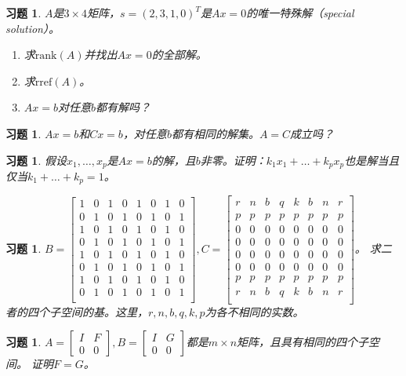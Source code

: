 \documentclass[UTF8]{ctexart}
\newcommand{\rref}{\mathrm{rref}}
\newcommand{\rank}{{\mathrm{rank}}}
\newtheorem{ex}[thm]{习题}
\begin{document}
\begin{ex}
		$A$是$3\times 4$矩阵，$s=(2,3,1,0)^T$是$Ax=0$的唯一特殊解（special solution）。
	\begin{enumerate}
		\item 求$\rank(A)$并找出$Ax=0$的全部解。
		\item 求$\rref(A)$。
			\item $Ax=b$对任意$b$都有解吗？
	\end{enumerate}
\end{ex}
\begin{ex}
		$Ax=b$和$Cx=b$，对任意$b$都有相同的解集。$A=C$成立吗？
\end{ex}



\begin{ex}
	假设$x_1,\dots,x_p$是$Ax=b$的解，且$b$非零。证明：$k_1x_1+\dots+k_px_p$也是解当且仅当$k_1+\dots+k_p=1$。
\end{ex}





\begin{ex}
		$B=\begin{bmatrix}
		1&0&1&0&1&0&1&0\\
		0&1&0&1&0&1&0&1\\
		1&0&1&0&1&0&1&0\\
		0&1&0&1&0&1&0&1\\
		1&0&1&0&1&0&1&0\\
		0&1&0&1&0&1&0&1\\
		1&0&1&0&1&0&1&0\\
		0&1&0&1&0&1&0&1\\
	\end{bmatrix},C=\begin{bmatrix}
	r&n&b&q&k&b&n&r\\
	p&p&p&p&p&p&p&p\\
	0&0&0&0&0&0&0&0\\
	0&0&0&0&0&0&0&0\\
	0&0&0&0&0&0&0&0\\
	0&0&0&0&0&0&0&0\\
	p&p&p&p&p&p&p&p\\
	r&n&b&q&k&b&n&r\\
	\end{bmatrix}$。
	求二者的四个子空间的基。这里，$r,n,b,q,k,p$为各不相同的实数。
\end{ex}


\begin{ex}
		$A=\begin{bmatrix}
		I & F\\0&0
	\end{bmatrix},B=\begin{bmatrix}
		I & G\\0&0
	\end{bmatrix}$都是$m\times n$矩阵，且具有相同的四个子空间。
	证明$F=G$。
\end{ex}
\end{document}
